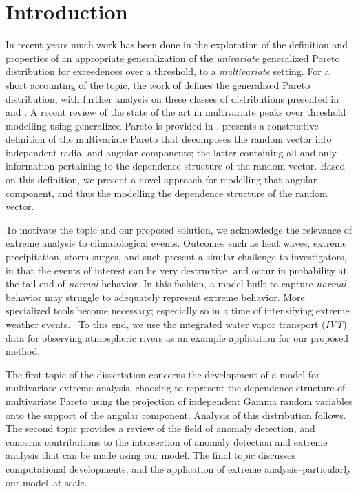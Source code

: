 
\section{Introduction}
In recent years much work has been done in the exploration of the definition and properties of an
  appropriate generalization of the \emph{univariate} generalized Pareto distribution for exceedences
  over a threshold, to a \emph{multivariate} setting.  For a short accounting of the topic, the work of
  \cite{rootzen2006} defines the generalized Pareto distribution, with further analysis on these classes
  of distributions presented in \cite{falk2008} and \cite{michel2008}.  A recent review of the state
  of the art in multivariate peaks over threshold modelling using generalized Pareto is provided in
  \cite{rootzen2018}.  \cite{ferreira2014} presents a constructive definition of the multivariate Pareto
  that decomposes the random vector into independent radial and angular components; the latter
  containing all and only information pertaining to the dependence structure of the random vector.
  Based on this definition, we present a novel approach for modelling that angular component, and thus
  the modelling the dependence structure of the random vector.

To motivate the topic and our proposed solution, we acknowledge the relevance of extreme analysis to
  climatological events.  Outcomes such as heat waves, extreme precipitation, storm surges, and
  such present a similar challenge to investigators, in that the events of interest can be very destructive,
  and occur in probability at the tail end of \emph{normal} behavior.  In this fashion, a model built
  to capture \emph{normal} behavior may struggle to adequately represent extreme behavior.  More
  specialized tools become necessary; especially so in a time of intensifying extreme weather
  events.~\citep{jentsch2007,vousdoukas2018,li2019}  To this end, we use the integrated water vapor
  transport (\emph{IVT}) data for observing atmospheric rivers as an example application for our proposed method.

The first topic of the dissertation concerns the development of a model for multivariate extreme analysis,
  choosing to represent the dependence structure of multivariate Pareto using the projection of independent
  Gamma random variables onto the support of the angular component.  Analysis of this distribution follows.
  The second topic provides a review of the field of anomaly detection, and concerns contributions
  to the intersection of anomaly detection and extreme analysis that can be made using our model.
  The final topic discusses computational developments, and the application of extreme
  analysis--particularly our model--at scale.

